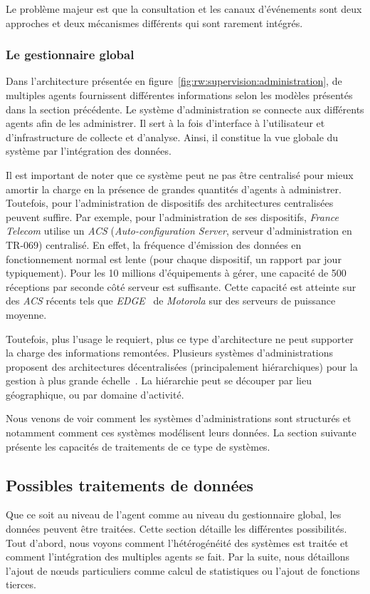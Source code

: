 Le problème majeur est que la consultation et les canaux d'événements sont deux approches et deux mécanismes différents qui sont rarement intégrés.

\subsubsection{Le gestionnaire global}
Dans l'architecture présentée en figure~\ref{fig:rw:supervision:administration}, de multiples agents fournissent différentes informations selon les modèles présentés dans la section précédente. Le système d'administration se connecte aux différents agents afin de les administrer. Il sert à la fois d'interface à l'utilisateur et d'infrastructure de collecte et d'analyse. Ainsi, il constitue la vue globale du système par l'intégration des données.

Il est important de noter que ce système peut ne pas être centralisé pour mieux amortir la charge en la présence de grandes quantités d'agents à administrer. Toutefois, pour l'administration de dispositifs des architectures centralisées peuvent suffire. Par exemple, pour l'administration de ses dispositifs, \textit{France Telecom} utilise un \textit{ACS} (\textit{Auto-configuration Server}, serveur d'administration en TR-069) centralisé. En effet, la fréquence d'émission des données en fonctionnement normal est lente (pour chaque dispositif, un rapport par jour typiquement). Pour les 10 millions d'équipements à gérer, une capacité de 500 réceptions par seconde côté serveur est suffisante. Cette capacité est atteinte sur des \textit{ACS} récents tels que \textit{EDGE}~\cite{Motorola:EDGE} de \textit{Motorola} sur des serveurs de puissance moyenne.

Toutefois, plus l'usage le requiert, plus ce type d'architecture ne peut supporter la charge des informations remontées. Plusieurs systèmes d'administrations proposent des architectures décentralisées (principalement hiérarchiques) pour la gestion à plus grande échelle~\cite{Kessis:management}. La hiérarchie peut se découper par lieu géographique, ou par domaine d'activité.

Nous venons de voir comment les systèmes d'administrations sont structurés et notamment comment ces systèmes modélisent leurs données. La section suivante présente les capacités de traitements de ce type de systèmes.

\subsection{Possibles traitements de données}
Que ce soit au niveau de l'agent comme au niveau du gestionnaire global, les données peuvent être traitées. Cette section détaille les différentes possibilités. Tout d'abord, nous voyons comment l'hétérogénéité des systèmes est traitée et comment l'intégration des multiples agents se fait. Par la suite, nous détaillons l'ajout de nœuds particuliers comme calcul de statistiques ou l'ajout de fonctions tierces.


